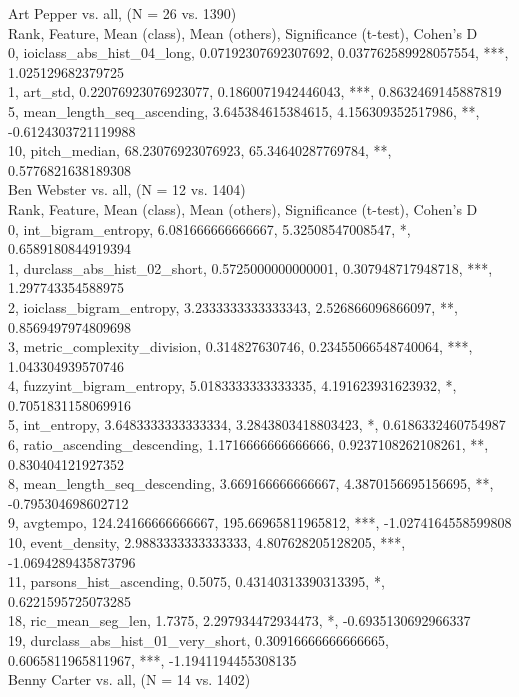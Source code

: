 Art Pepper vs. all, (N = 26 vs. 1390)\\
Rank, Feature, Mean (class), Mean (others), Significance (t-test), Cohen's D\\
0, ioiclass_abs_hist_04_long, 0.07192307692307692, 0.037762589928057554, ***, 1.025129682379725\\
1, art_std, 0.22076923076923077, 0.1860071942446043, ***, 0.8632469145887819\\
5, mean_length_seq_ascending, 3.645384615384615, 4.156309352517986, **, -0.6124303721119988\\
10, pitch_median, 68.23076923076923, 65.34640287769784, **, 0.5776821638189308\\
Ben Webster vs. all, (N = 12 vs. 1404)\\
Rank, Feature, Mean (class), Mean (others), Significance (t-test), Cohen's D\\
0, int_bigram_entropy, 6.081666666666667, 5.32508547008547, *, 0.6589180844919394\\
1, durclass_abs_hist_02_short, 0.5725000000000001, 0.307948717948718, ***, 1.297743354588975\\
2, ioiclass_bigram_entropy, 3.2333333333333343, 2.526866096866097, **, 0.8569497974809698\\
3, metric_complexity_division, 0.314827630746, 0.23455066548740064, ***, 1.043304939570746\\
4, fuzzyint_bigram_entropy, 5.0183333333333335, 4.191623931623932, *, 0.7051831158069916\\
5, int_entropy, 3.6483333333333334, 3.2843803418803423, *, 0.6186332460754987\\
6, ratio_ascending_descending, 1.1716666666666666, 0.9237108262108261, **, 0.830404121927352\\
8, mean_length_seq_descending, 3.669166666666667, 4.3870156695156695, **, -0.795304698602712\\
9, avgtempo, 124.24166666666667, 195.66965811965812, ***, -1.0274164558599808\\
10, event_density, 2.9883333333333333, 4.807628205128205, ***, -1.0694289435873796\\
11, parsons_hist_ascending, 0.5075, 0.43140313390313395, *, 0.6221595725073285\\
18, ric_mean_seg_len, 1.7375, 2.297934472934473, *, -0.6935130692966337\\
19, durclass_abs_hist_01_very_short, 0.30916666666666665, 0.6065811965811967, ***, -1.1941194455308135\\
Benny Carter vs. all, (N = 14 vs. 1402)\\
